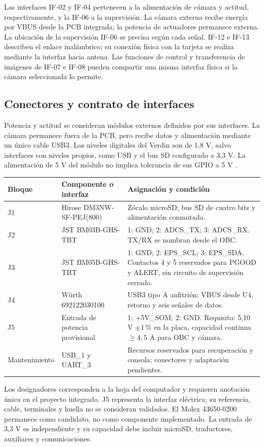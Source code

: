 \documentclass[11pt,letterpaper]{article}
\begin{document}
\normalsize
Las interfaces IF-02 y IF-04 pertenecen a la alimentación de cámara y actitud, respectivamente, y la IF-06 a la supervisión. La cámara externa recibe energía por VBUS desde la PCB integrada; la potencia de actuadores permanece externa. La ubicación de la supervisión IF-06 se precisa según cada señal. IF-12 e IF-13 describen el enlace inalámbrico; su conexión física con la tarjeta se realiza mediante la interfaz hacia antena. Las funciones de control y transferencia de imágenes de IF-07 e IF-08 pueden compartir una misma interfaz física si la cámara seleccionada lo permite.

\subsection{Conectores y contrato de interfaces}
\label{sec:conectores}
\label{sec:contrato_interfaces}
Potencia y actitud se consideran módulos externos definidos por sus interfaces. La cámara permanece fuera de la PCB, pero recibe datos y alimentación mediante un único cable USB3. Los niveles digitales del Verdin son de 1,8 V, salvo interfaces con niveles propios, como USB y el bus SD configurado a 3,3 V. La alimentación de 5 V del módulo no implica tolerancia de sus GPIO a 5 V \cite{verdinds}.

\begin{longtable}{L{1.2cm}L{4.1cm}L{8.3cm}}
\toprule Bloque & Componente o interfaz & Asignación y condición \\
\midrule\endhead
J1 & Hirose DM3NW-SF-PEJ(800) & Zócalo microSD; bus SD de cuatro bits y alimentación conmutada. \\
J2 & JST BM03B-GHS-TBT & 1: GND; 2: ADCS\_TX; 3: ADCS\_RX. TX/RX se nombran desde el OBC. \\
J3 & JST BM05B-GHS-TBT & 1: GND; 2: EPS\_SCL; 3: EPS\_SDA. Contactos 4 y 5 reservados para PGOOD y ALERT, sin circuito de supervisión cerrado. \\
J4 & Würth 692122030100 & USB3 tipo A anfitrión; VBUS desde U4, retorno y seis señales de datos. \\
J5 & Entrada de potencia provisional & 1: +5V\_SOM; 2: GND. Requisito: 5,10 V $\pm1\,\%$ en la placa, capacidad continua $\geq4,5$ A para OBC y cámara. \\
Mantenimiento & USB\_1 y UART\_3 & Recursos reservados para recuperación y consola; conectores y adaptación pendientes. \\
\bottomrule
\end{longtable}
Los designadores corresponden a la hoja del computador y requieren anotación única en el proyecto integrado. J5 representa la interfaz eléctrica; su referencia, cable, terminales y huella no se consideran validados. El Molex 43650-0200 permanece como candidato, no como componente implementado. La entrada de 3,3 V es independiente y su capacidad debe incluir microSD, traductores, auxiliares y comunicaciones.
\end{document}
